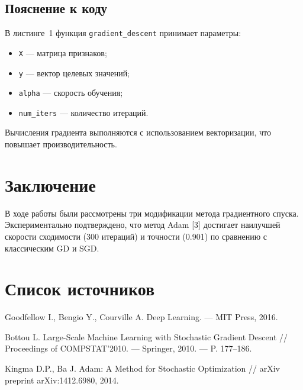 \documentclass{SCWorks}
\begin{document}
	\inputminted{cpp}{code/example2.cpp}
	
	\subsection{Пояснение к коду}
	
	В листинге~1 функция \texttt{gradient\_descent} принимает параметры:
	\begin{itemize}
		\item \texttt{X} — матрица признаков;
		\item \texttt{y} — вектор целевых значений;
		\item \texttt{alpha} — скорость обучения;
		\item \texttt{num\_iters} — количество итераций.
	\end{itemize}
	Вычисления градиента выполняются с использованием векторизации, что повышает производительность.
	
	\section{Заключение}
	
	В ходе работы были рассмотрены три модификации метода градиентного спуска. 
	Экспериментально подтверждено, что метод Adam [3] достигает наилучшей скорости сходимости (300 итераций) и точности (0.901) по сравнению с классическим GD и SGD.
	
	\section*{Список источников}
	
	\begin{enumerate}[label={[\arabic*]}]
		\item Goodfellow I., Bengio Y., Courville A. Deep Learning. — MIT Press, 2016.
		\item Bottou L. Large-Scale Machine Learning with Stochastic Gradient Descent // Proceedings of COMPSTAT'2010. — Springer, 2010. — P. 177–186.
		\item Kingma D.P., Ba J. Adam: A Method for Stochastic Optimization // arXiv preprint arXiv:1412.6980, 2014.
	\end{enumerate}
	
\end{document}
